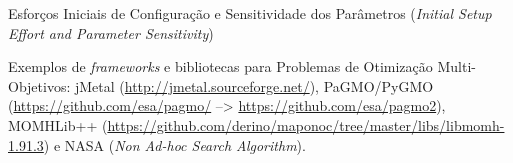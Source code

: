 \documentclass[tese-proposta,nocipinfo]{texufpel}
\begin{document}
Esforços Iniciais de Configuração e Sensitividade dos Parâmetros (\textit{Initial Setup Effort and Parameter Sensitivity})

Exemplos de \textit{frameworks} e bibliotecas para Problemas de Otimização Multi-Objetivos: jMetal (\url{http://jmetal.sourceforge.net/}), PaGMO/PyGMO (\url{https://github.com/esa/pagmo/} --> \url{https://github.com/esa/pagmo2}), MOMHLib++ (\url{https://github.com/derino/maponoc/tree/master/libs/libmomh-1.91.3}) e NASA (\textit{Non Ad-hoc Search Algorithm}).

\end{document}
